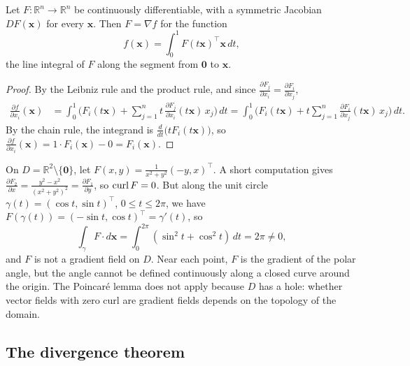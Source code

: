 \begin{theorem}\label{L3-thm:poincare}
    Let $F: \mathbb{R}^n \to \mathbb{R}^n$ be continuously differentiable, with a symmetric Jacobian $DF(\mathbf{x})$ for every $\mathbf{x}$. Then $F = \nabla f$ for the function
    \[f(\mathbf{x}) = \int_0^1 F(t\mathbf{x})^\top\mathbf{x}\, dt,\]
    the line integral of $F$ along the segment from $\mathbf{0}$ to $\mathbf{x}$.
\end{theorem}

\begin{proof}
    By the Leibniz rule and the product rule, and since $\frac{\partial F_j}{\partial x_i} = \frac{\partial F_i}{\partial x_j}$,
    \begin{align*}
        \frac{\partial f}{\partial x_i}(\mathbf{x}) &= \int_0^1 \Big(F_i(t\mathbf{x}) + \sum_{j=1}^n t\,\frac{\partial F_j}{\partial x_i}(t\mathbf{x})\,x_j\Big)\, dt = \int_0^1 \Big(F_i(t\mathbf{x}) + t\sum_{j=1}^n \frac{\partial F_i}{\partial x_j}(t\mathbf{x})\,x_j\Big)\, dt.
    \end{align*}
    By the chain rule, the integrand is $\frac{d}{dt}\big(tF_i(t\mathbf{x})\big)$, so $\frac{\partial f}{\partial x_i}(\mathbf{x}) = 1 \cdot F_i(\mathbf{x}) - 0 = F_i(\mathbf{x})$.
\end{proof}

\begin{example}\label{L3-ex:vortex}
    On $D = \mathbb{R}^2 \setminus \{\mathbf{0}\}$, let $F(x, y) = \frac{1}{x^2 + y^2}(-y, x)^\top$. A short computation gives $\frac{\partial F_2}{\partial x} = \frac{y^2 - x^2}{(x^2 + y^2)^2} = \frac{\partial F_1}{\partial y}$, so $\operatorname{curl} F = 0$. But along the unit circle $\gamma(t) = (\cos t, \sin t)^\top$, $0 \leq t \leq 2\pi$, we have $F(\gamma(t)) = (-\sin t, \cos t)^\top = \gamma'(t)$, so
    \[\int_\gamma F \cdot d\mathbf{x} = \int_0^{2\pi} (\sin^2 t + \cos^2 t)\, dt = 2\pi \neq 0,\]
    and $F$ is not a gradient field on $D$. Near each point, $F$ is the gradient of the polar angle, but the angle cannot be defined continuously along a closed curve around the origin. The Poincar\'e lemma does not apply because $D$ has a hole: whether vector fields with zero curl are gradient fields depends on the topology of the domain.
\end{example}

\subsection{The divergence theorem}


